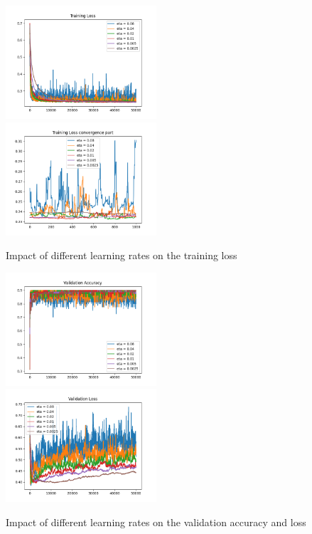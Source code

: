 \documentclass{article}
\begin{document}
\begin{figure}[htbp]
  \includegraphics[width=0.5\textwidth]{../image/training_loss.png}
  \includegraphics[width=0.5\textwidth]{../image/training_loss_part.png}
  \caption{Impact of different learning rates on the training loss}
\label{fig:training}
\end{figure}


\begin{figure}[htbp]
  \includegraphics[width=0.5\textwidth]{../image/valid_acc.png}
  \includegraphics[width=0.5\textwidth]{../image/valid_loss.png}
  \caption{Impact of different learning rates on the validation accuracy and loss}
\label{fig:valid}
\end{figure}
\end{document}
